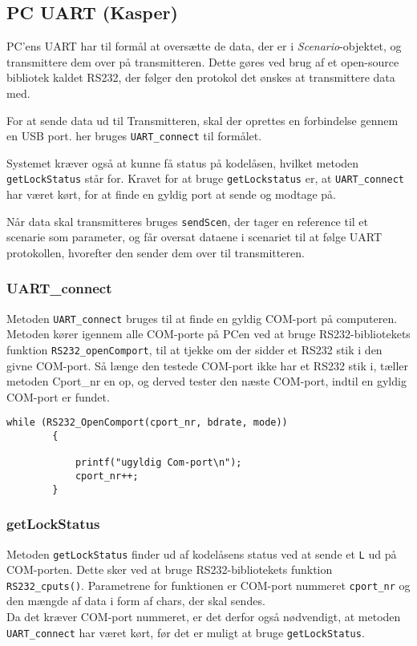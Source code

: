 \subsection{PC UART (Kasper)}

PC'ens UART har til formål at oversætte de data, der er i \textit{Scenario}-objektet, og transmittere dem over på transmitteren. Dette gøres ved brug af et open-source bibliotek kaldet RS232\cite{lib:UART}, der følger den protokol det ønskes at transmittere data med.

For at sende data ud til Transmitteren, skal der oprettes en forbindelse gennem en USB port. her bruges \texttt{UART\_connect} til formålet.

Systemet kræver også at kunne få status på kodelåsen, hvilket metoden \texttt{getLockStatus} står for. Kravet for at bruge \texttt{getLockstatus} er, at \texttt{UART\_connect} har været kørt, for at finde en gyldig port at sende og modtage på.

Når data skal transmitteres bruges \texttt{sendScen}, der tager en reference til et scenarie som parameter, og får oversat dataene i scenariet til at følge UART protokollen, hvorefter den sender dem over til transmitteren.


\subsubsection{UART\_connect}
Metoden \texttt{UART\_connect} bruges til at finde en gyldig COM-port på computeren. Metoden kører igennem alle COM-porte på PCen ved at bruge RS232-bibliotekets funktion \texttt{RS232\_openComport}, til at tjekke om der sidder et RS232 stik i den givne COM-port. Så længe den testede COM-port ikke har et RS232 stik i, tæller metoden Cport\_nr en op, og derved tester den næste COM-port, indtil en gyldig COM-port er fundet.

\begin{lstlisting}
while (RS232_OpenComport(cport_nr, bdrate, mode))
		{

			printf("ugyldig Com-port\n");
			cport_nr++;
		}
\end{lstlisting}

\subsubsection{getLockStatus}
Metoden \texttt{getLockStatus} finder ud af kodelåsens status ved at sende et \texttt{L} ud på COM-porten. Dette sker ved at bruge RS232-bibliotekets funktion \texttt{RS232\_cputs()}. Parametrene for funktionen er COM-port nummeret \texttt{cport\_nr} og den mængde af data i form af chars, der skal sendes.\\
Da det kræver COM-port nummeret, er det derfor også nødvendigt, at metoden \texttt{UART\_connect} har været kørt, før det er muligt at bruge \texttt{getLockStatus}.

